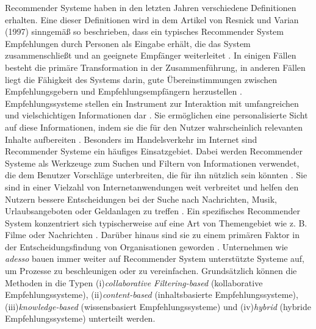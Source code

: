 Recommender Systeme haben in den letzten Jahren verschiedene Definitionen erhalten. Eine dieser Definitionen wird in dem Artikel von Resnick und Varian (1997) sinngemäß so beschrieben, dass ein typisches Recommender System Empfehlungen durch Personen als Eingabe erhält, die das System zusammenschließt und an geeignete Empfänger weiterleitet \cite{burke2011recommender}. In einigen Fällen besteht die primäre Transformation in der Zusammenführung, in anderen Fällen liegt die Fähigkeit des Systems darin, gute Übereinstimmungen zwischen Empfehlungsgebern und Empfehlungsempfängern herzustellen \cite{burke2011recommender}. Empfehlungssysteme stellen ein Instrument zur Interaktion mit umfangreichen und vielschichtigen Informationen dar \cite{burke2011recommender}. Sie ermöglichen eine personalisierte Sicht auf diese Informationen, indem sie die für den Nutzer wahrscheinlich relevanten Inhalte aufbereiten \cite{burke2011recommender}. Besonders im Handelsverkehr im Internet sind Recommender Systeme ein häufiges Einsatzgebiet. Dabei werden Recommender Systeme als Werkzeuge zum Suchen und Filtern von Informationen verwendet, die dem Benutzer Vorschläge unterbreiten, die für ihn nützlich sein könnten \cite{burke2011recommender}. Sie sind in einer Vielzahl von Internetanwendungen weit verbreitet und helfen den Nutzern bessere Entscheidungen bei der Suche nach Nachrichten, Musik, Urlaubsangeboten oder Geldanlagen zu treffen \cite{ricci2014recommender}. Ein spezifisches Recommender System konzentriert sich typischerweise auf eine Art von Themengebiet wie z. B. Filme oder Nachrichten \cite{ricci2014recommender}. Darüber hinaus sind sie zu einem primären Faktor in der Entscheidungsfindung von Organisationen geworden \cite{chartron2014general}. Unternehmen wie \emph{adesso} bauen immer weiter auf Recommender System unterstützte Systeme auf, um Prozesse zu beschleunigen oder zu vereinfachen. Grundsätzlich können die Methoden in die Typen (i)\emph{collaborative Filtering-based} (kollaborative Empfehlungssysteme), (ii)\emph{content-based} (inhaltsbasierte Empfehlungssysteme), (iii)\emph{knowledge-based} (wissensbasiert Empfehlungssysteme) und (iv)\emph{hybrid} (hybride Empfehlungssysteme) unterteilt werden.\\

